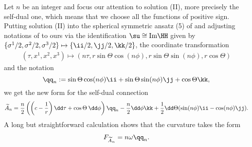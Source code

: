 \documentclass[a4paper,12pt,draft]{article}
\begin{document}
Let $n$ be an integer 
and focus our attention to solution (II), more precisely the self-dual
one, which means that we choose all the functions of positive sign.
Putting solution (II) into the spherical symmetric ansatz (5) of
\cite{charap-duff} and adjusting notations of \cite{charap-duff} 
to ours via the identification $\su\cong{\rm Im}\HH$ given by 
$\{\sigma^1/2,\sigma^2/2,\sigma^3/2\}\mapsto\{\ii /2 ,\jj /2 ,\kk /2\}$,
the coordinate transformation 
\begin{eqnarray}
(\tau , x^1, x^2, x^3)\longmapsto (n\tau, r\sin\Theta\cos (n \phi)
,r\sin\Theta\sin(n \phi) ,r\cos\Theta )
\label{transformation}
\end{eqnarray} and the notation 
$$\qq_n:=\sin\Theta\cos(n\phi)\ii
+\sin\Theta\sin(n\phi)\jj +\cos\Theta\kk,$$
we get the new form for the self-dual connection 
\begin{eqnarray}
\widetilde{A}_n={n\over 2}\left(\left(
c-{1\over r}\right)\dd\tau +\cos\Theta\:\dd\phi\right)\qq_n 
-{n\over 2}\dd\phi\kk 
+{1\over 2}\dd\Theta (\sin (n\phi )\ii -\cos (n\phi )\jj ).
\label{connection}\end{eqnarray}
A long but 
straightforward calculation shows that the curvature takes the form
\begin{eqnarray}
{F}_{\widetilde{A}_n}=n \omega\qq_n. 
\label{gorbulete}
\end{eqnarray}
\end{document}
